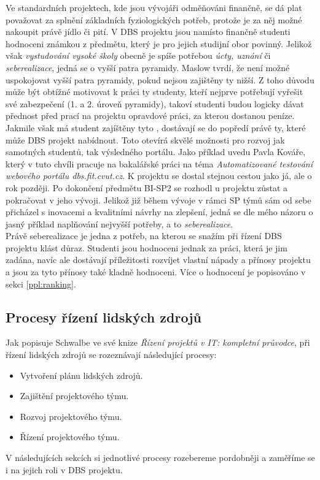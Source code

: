 Ve standardních projektech, kde jsou vývojáři odměňováni finančně, se dá plat považovat za splnění základních fyziologických potřeb, protože je za něj možné nakoupit právě jídlo či pití. V DBS projektu jsou namísto finančně studenti hodnoceni známkou z předmětu, který je pro jejich studijní obor povinný. Jelikož však \emph{vystudování vysoké školy} obecně je spíše potřebou \emph{úcty, uznání} či \emph{seberealizace}, jedná se o vyšší patra pyramidy. Maslow \cite{maslow} tvrdí, že není možné uspokojovat vyšší patra pyramidy, pokud nejsou zajištěny ty nižší. Z toho důvodu může být obtížné motivovat k práci ty studenty, kteří nejprve potřebují vyřešit své zabezpečení (1. a 2. úroveň pyramidy), takoví studenti budou logicky dávat přednost před prací na projektu opravdové práci, za kterou dostanou peníze. Jakmile však má student zajíštěny tyto , dostávají se do popředí právě ty, které může DBS projekt nabídnout. Toto otevírá skvělé možnosti pro rozvoj jak samotných studentů, tak výsledného portálu. Jako příklad uvedu Pavla Kováře, který v tuto chvíli pracuje na bakalářské práci na téma \emph{Automatizované testování webového portálu dbs.fit.cvut.cz}. K projektu se dostal stejnou cestou jako já, ale o rok později. Po dokončení předmětu BI-SP2 se rozhodl u projektu zůstat a pokračovat v jeho vývoji. Jelikož již během vývoje v rámci SP týmů sám od sebe přicházel s inovacemi a kvalitními návrhy na zlepšení, jedná se dle mého názoru o jasný příklad naplňování nejvyšší potřeby, a to \emph{seberealizace}.\\
Právě seberealizace je jedna z potřeb, na kterou se snažím při řízení DBS projektu klást důraz. Studenti jsou hodnoceni jednak za práci, která je jim zadána, navíc ale dostávají příležitosti rozvíjet vlastní nápady a přínosy projektu a jsou za tyto přínosy také kladně hodnoceni. Více o hodnocení je popisováno v sekci \ref{ppl:ranking}.

\subsection{Procesy řízení lidských zdrojů}

Jak popisuje Schwalbe \cite{schwalbe} ve své knize \emph{Řízení projektů v IT: kompletní průvodce}, při řízení lidských zdrojů se rozeznávají následující procesy:
\begin{itemize}
	\item Vytvoření plánu lidských zdrojů.
	\item Zajištění projektového týmu.
	\item Rozvoj projektového týmu.
	\item Řízení projektového týmu.
\end{itemize}
V následujících sekcích si jednotlivé procesy rozebereme pordobněji a zaměříme se i na jejich roli v DBS projektu.


